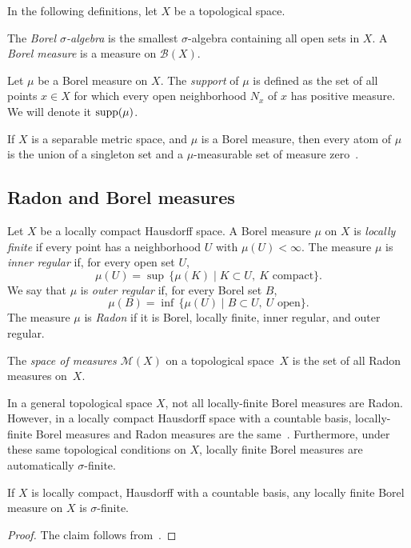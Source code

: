 In the following definitions, let $X$ be a topological space.

\begin{definition}
The \emph{Borel $\sigma$-algebra} is the smallest $\sigma$-algebra containing all open sets in $X$. A \emph{Borel measure} is a measure on $\mathcal{B}(X)$.
\end{definition}

\begin{definition}
Let $\mu$ be a Borel measure on $X$. The \emph{support} of $\mu$ is defined as the set of all points $x \in X$ for which every open neighborhood $N_x$ of $x$ has positive measure. We will denote it $\operatorname{supp}(\mu)$.
\label{def:support}
\end{definition}

If $X$ is a separable metric space, and $\mu$ is a Borel measure, then
every atom of $\mu$ is the union of a singleton set and a $\mu$-measurable set of
measure zero~\cite[2.1.6, Theorem~2]{Kad18:MeasureTheory}.

\subsection{Radon and Borel measures}
\label{subsec:RadonvsBorel}

\begin{definition}
Let $X$ be a locally compact Hausdorff space. A Borel measure $\mu$ on $X$ is \emph{locally finite} if every point has a neighborhood $U$ with $\mu(U)< \infty$.
The measure $\mu$ is \emph{inner regular} if, for every open set $U$,
\[
  \mu(U) = \sup\, \{ \mu(K) \mid K \subset U,\ \text{$K$ compact} \}.
\]
We say that $\mu$ is \emph{outer regular} if, for every Borel set $B$,
\[
  \mu(B) = \inf\, \{ \mu(U) \mid B \subset U,\ \text{$U$ open} \}.
\]
The measure $\mu$ is \emph{Radon} if it is Borel, locally finite,
inner regular, and outer regular.
\label{def:radon}
\end{definition}

\begin{definition}
  The \emph{space of measures $\mathcal{M}(X)$} on a topological
  space~$X$ is the set of all Radon measures on~$X$.
\end{definition}

In a general topological space $X$, not all locally-finite Borel
measures are Radon. However, in a locally compact Hausdorff space with
a countable basis, locally-finite Borel measures and Radon measures
are the same~\cite[Theorem~29.12]{Bau01:Measure}.
Furthermore, under these same topological conditions on $X$, locally
finite Borel measures are automatically $\sigma$-finite.
\begin{lemma}
\label{lem:sigma_finite}
If $X$ is locally compact, Hausdorff with a countable basis, any locally finite Borel measure on $X$ is $\sigma$-finite.
\end{lemma}
\begin{proof}
The claim follows from~\cite[Section~411G(e)]{Fre13:SpacesOfMeasures}.
\end{proof}

